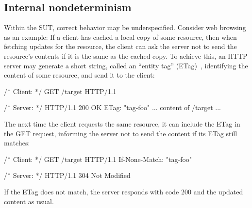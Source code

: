 \subsection{Internal nondeterminism}
\label{sec:internal-nondeterminism}
Within the SUT, correct behavior may be \mbox{underspecified}.  Consider web
browsing as an example: If a client has cached a local copy of some resource,
then when fetching updates for the resource, the client can ask the server not
to send the resource's contents if it is the same as the cached copy.  To
achieve this, an HTTP server may generate a short string, called an ``entity
tag'' (ETag)~\cite{rfc7232}, identifying the content of some resource, and send
it to the client:
\begin{multicols}{2}
\begin{cpp}
  /* Client: */
  GET /target HTTP/1.1
\end{cpp}
\columnbreak
\begin{cpp}
  /* Server: */
  HTTP/1.1 200 OK
  ETag: "tag-foo"
  ... content of /target ...
\end{cpp}
\end{multicols}
The next time the client requests the same resource, it can include the ETag in
the GET request, informing the server not to send the content if its ETag still
matches:
\begin{multicols}{2}
\begin{cpp}
  /* Client: */
  GET /target HTTP/1.1
  If-None-Match: "tag-foo"
\end{cpp}
\columnbreak
\begin{cpp}
  /* Server: */
  HTTP/1.1 304 Not Modified
\end{cpp}
\end{multicols}
If the ETag does not match, the server responds with code 200 and the updated
content as usual.

